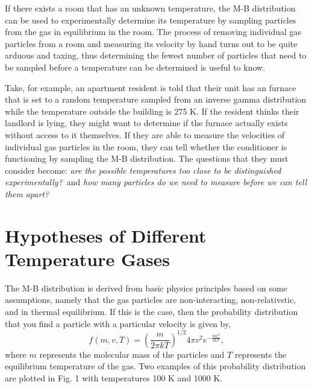 \documentclass[%
 reprint,
 amsmath,amssymb,
 aps,
]{revtex4-2}
\begin{document}
If there exists a room that has an unknown temperature, the M-B distribution can be used to experimentally determine its temperature by sampling particles from the gas in equilibrium in the room. The process of removing individual gas particles from a room and measuring its velocity by hand turns out to be quite arduous and taxing, thus determining the fewest number of particles that need to be sampled before a temperature can be determined is useful to know.

Take, for example, an apartment resident is told that their unit has an furnace that is set to a random temperature sampled from an inverse gamma distribution while the temperature outside the building is 275 K. If the resident thinks their landlord is lying, they might want to determine if the furnace actually exists without access to it themselves. If they are able to measure the velocities of individual gas particles in the room, they can tell whether the conditioner is functioning by sampling the M-B distribution. The questions that they must consider become: \textit{are the possible temperatures too close to be distinguished experimentally?}\ and \textit{how many particles do we need to measure before we can tell them apart?}

\section{Hypotheses of Different Temperature Gases}

The M-B distribution is derived from basic physics principles based on some assumptions, namely that the gas particles are non-interacting, non-relativstic, and in thermal equilibrium. If this is the case, then the probability distribution that you find a particle with a particular velocity is given by,
\[
	f(m, v, T) = \left( \frac{m}{2\pi k T} \right)^{1/2}4\pi v^2 e^{-\frac{mv^2}{2kT}},
\]
where $m$ represents the molecular mass of the particles and $T$ represents the equilibrium temperature of the gas. Two examples of this probability distribution are plotted in Fig. 1 with temperatures 100 K and 1000 K. 
\end{document}
